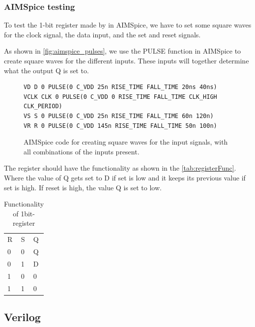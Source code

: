 \subsubsection{AIMSpice testing}
\label{subsubsec:aimspice_testing}
To test the 1-bit register made by in AIMSpice, we have to set some square waves for the clock signal, the data input, and the set and reset signals.

As shown in \autoref{fig:aimspice_pulses}, we use the PULSE function in AIMSpice to create square waves for the different inputs. These inputs will together determine what the output Q is set to.

\begin{figure}[H]
\centering
\begin{minipage}{0.9\textwidth}
\begin{lstlisting}[style=aimspiceStyle]
VD D 0 PULSE(0 C_VDD 25n RISE_TIME FALL_TIME 20ns 40ns)
VCLK CLK 0 PULSE(0 C_VDD 0 RISE_TIME FALL_TIME CLK_HIGH CLK_PERIOD)
VS S 0 PULSE(0 C_VDD 25n RISE_TIME FALL_TIME 60n 120n)
VR R 0 PULSE(0 C_VDD 145n RISE_TIME FALL_TIME 50n 100n)
\end{lstlisting}
\end{minipage}
\caption{AIMSpice code for creating square waves for the input signals, with all combinations of the inputs present.}
\label{fig:aimspice_pulses}
\end{figure}

The register should have the functionality as shown in the \autoref{tab:registerFunc}. Where the value of Q gets set to D if set is low and it keeps its previous value if set is high. If reset is high, the value Q is set to low. 

\begin{table}[H]
\centering
\caption{Functionality of 1bit-register}
\label{tab:registerFunc}
\begin{tabular}{|l|l|l|}
\cline{1-3}
\rowcolor[HTML]{C0C0C0} 
R & S & Q  \\ \cline{1-3}
0 & 0 & Q  \\ \cline{1-3}
0 & 1 & D  \\ \cline{1-3}
1 & 0 & 0  \\ \cline{1-3}
1 & 1 & 0  \\ \cline{1-3}
\end{tabular}
\end{table}


\subsection{Verilog}

